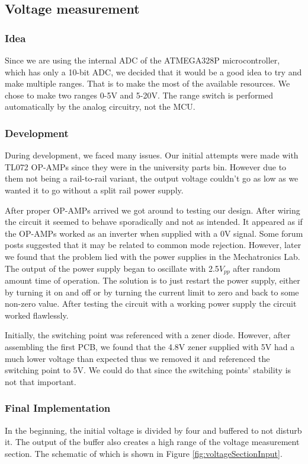 \subsection{Voltage measurement}
\label{sec:method_voltage}

\subsubsection{Idea}
Since we are using the internal ADC of the ATMEGA328P microcontroller, which has only a 10-bit ADC, we decided that it would be a good idea to try and make multiple ranges.
That is to make the most of the available resources.
We chose to make two ranges 0-5V and 5-20V. The range switch is performed automatically by the analog circuitry, not the MCU.

\subsubsection{Development}
During development, we faced many issues. Our initial attempts were made with TL072 OP-AMPs since they were in the university parts bin. However due to them not being a rail-to-rail variant, the output voltage couldn't go as low as we wanted it to go without a split rail power supply. 

After proper OP-AMPs arrived we got around to testing our design. After wiring the circuit it seemed to behave sporadically and not as intended. It appeared as if the OP-AMPs worked as an inverter when supplied with a 0V signal. Some forum posts suggested that it may be related to common mode rejection. However, later we found that the problem lied with the power supplies in the Mechatronics Lab. The output of the power supply began to oscillate with 2.5$V_{pp}$ after random amount time of operation. The solution is to just restart the power supply, either by turning it on and off or by turning the current limit to zero and back to some non-zero value. After testing the circuit with a working power supply the circuit worked flawlessly. 

Initially, the switching point was referenced with a zener diode. However, after assembling the first PCB, we found that the 4.8V zener supplied with 5V had a much lower voltage than expected thus we removed it and referenced the switching point to 5V. We could do that since the switching points' stability is not that important.

\subsubsection{Final Implementation}
In the beginning, the initial voltage is divided by four and buffered to not disturb it. The output of the buffer also creates a high range of the voltage measurement section. The schematic of which is shown in Figure \ref{fig:voltageSectionInput}.

